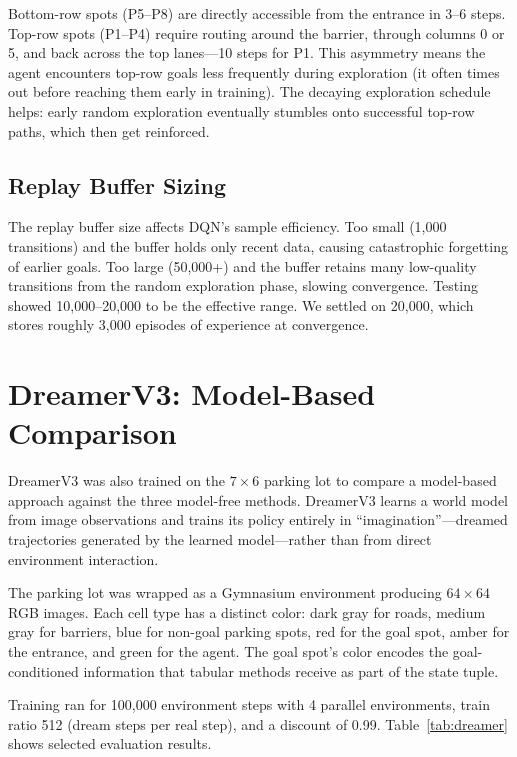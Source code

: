 \documentclass[letterpaper]{article}
\begin{document}
Bottom-row spots (P5--P8) are directly accessible from the entrance in 3--6 steps. Top-row spots (P1--P4) require routing around the barrier, through columns 0 or 5, and back across the top lanes---10 steps for P1. This asymmetry means the agent encounters top-row goals less frequently during exploration (it often times out before reaching them early in training). The decaying exploration schedule helps: early random exploration eventually stumbles onto successful top-row paths, which then get reinforced.

\subsection{Replay Buffer Sizing}

The replay buffer size affects DQN's sample efficiency. Too small (1,000 transitions) and the buffer holds only recent data, causing catastrophic forgetting of earlier goals. Too large (50,000+) and the buffer retains many low-quality transitions from the random exploration phase, slowing convergence. Testing showed 10,000--20,000 to be the effective range. We settled on 20,000, which stores roughly 3,000 episodes of experience at convergence.


\section{DreamerV3: Model-Based Comparison}

DreamerV3 \citep{hafner2023dreamerv3} was also trained on the $7 \times 6$ parking lot to compare a model-based approach against the three model-free methods. DreamerV3 learns a world model from image observations and trains its policy entirely in ``imagination''---dreamed trajectories generated by the learned model---rather than from direct environment interaction.

The parking lot was wrapped as a Gymnasium environment producing $64 \times 64$ RGB images. Each cell type has a distinct color: dark gray for roads, medium gray for barriers, blue for non-goal parking spots, red for the goal spot, amber for the entrance, and green for the agent. The goal spot's color encodes the goal-conditioned information that tabular methods receive as part of the state tuple.

Training ran for 100,000 environment steps with 4 parallel environments, train ratio 512 (dream steps per real step), and a discount of 0.99. Table~\ref{tab:dreamer} shows selected evaluation results.
\end{document}
